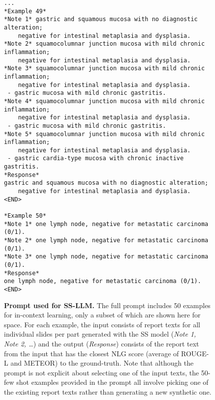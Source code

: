 \documentclass[11pt]{article}
\newcommand{\llmmodel}{\textsc{SS-LLM}\xspace}
\begin{document}
\begin{figure}[h]
\begin{verbatim}
...
*Example 49*
*Note 1* gastric and squamous mucosa with no diagnostic alteration; 
    negative for intestinal metaplasia and dysplasia.
*Note 2* squamocolumnar junction mucosa with mild chronic inflammation; 
    negative for intestinal metaplasia and dysplasia.
*Note 3* squamocolumnar junction mucosa with mild chronic inflammation; 
    negative for intestinal metaplasia and dysplasia.
 - gastric mucosa with mild chronic gastritis.
*Note 4* squamocolumnar junction mucosa with mild chronic inflammation; 
    negative for intestinal metaplasia and dysplasia.
 - gastric mucosa with mild chronic gastritis.
*Note 5* squamocolumnar junction mucosa with mild chronic inflammation; 
    negative for intestinal metaplasia and dysplasia.
 - gastric cardia-type mucosa with chronic inactive gastritis.
*Response*
gastric and squamous mucosa with no diagnostic alteration; 
    negative for intestinal metaplasia and dysplasia.
<END>

*Example 50*
*Note 1* one lymph node, negative for metastatic carcinoma (0/1).
*Note 2* one lymph node, negative for metastatic carcinoma (0/1).
*Note 3* one lymph node, negative for metastatic carcinoma (0/1).
*Response*
one lymph node, negative for metastatic carcinoma (0/1).
<END>
\end{verbatim}
\caption{\small \textbf{Prompt used for \llmmodel.} The full prompt includes 50 examples for in-context learning, only a subset of which are shown here for space. For each example, the input consists of report texts for all individual slides per part generated with the SS model (\emph{Note 1, Note 2, …}) and the output (\emph{Response}) consists of the report text from the input that has the closest NLG score (average of ROUGE-L and METEOR) to the ground-truth. Note that although the prompt is not explicit about selecting one of the input texts, the 50-few shot examples provided in the prompt all involve picking one of the existing report texts rather than generating a new synthetic one.}
\label{fig:prompt}
\end{figure}
\end{document}
